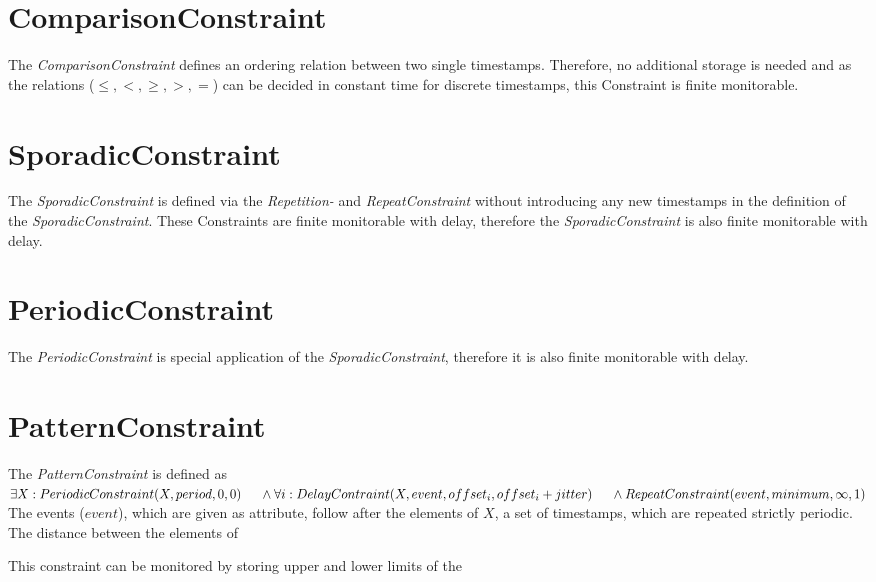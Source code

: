 \section{ComparisonConstraint}
	The \emph{ComparisonConstraint} defines an ordering relation between two single timestamps. Therefore, no additional storage is needed and as the relations ($\leq, <, \geq, >, =$) can be decided in constant time for discrete timestamps, this Constraint is finite monitorable.
	
\section{SporadicConstraint}
	The \emph{SporadicConstraint} is defined via the \emph{Repetition-} and \emph{RepeatConstraint} without introducing any new timestamps in the definition of the \emph{SporadicConstraint}. These Constraints are finite monitorable with delay, therefore the \emph{SporadicConstraint} is also finite monitorable with delay.
	
\section{PeriodicConstraint}
	The \emph{PeriodicConstraint} is special application of the \emph{SporadicConstraint}, therefore it is also finite monitorable with delay.
	
\section{PatternConstraint}
	The \emph{PatternConstraint} is defined as\\[10pt]
	\begin{math}
		\exists X: PeriodicConstraint(X, period, 0, 0)\\
		\text{\hspace{.5cm}} \land \forall i: DelayContraint(X, event, offset_i, offset_i+jitter)\\
		\text{\hspace{.5cm}} \land RepeatConstraint(event, minimum, \infty, 1)
	\end{math}\\[10pt]
	The events ($event$), which are given as attribute, follow after the elements of $X$, a set of timestamps, which are repeated strictly periodic. The distance between the elements of 

	
	This constraint can be monitored by storing upper and lower limits of the 
	
